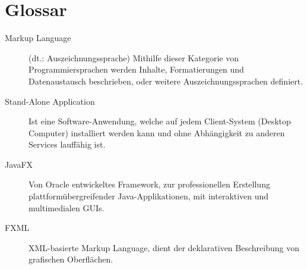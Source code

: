 \chapter{Glossar}

\begin{description}
\item[Markup Language] (dt.: Auszeichnungssprache) Mithilfe dieser Kategorie von Programmiersprachen werden Inhalte, Formatierungen und Datenaustausch beschrieben, oder weitere Auszeichnungssprachen definiert.
\item[Stand-Alone Application] Ist eine Software-Anwendung, welche auf jedem Client-System (Desktop Computer) installiert werden kann und ohne Abhängigkeit zu anderen Services lauffähig ist.
\item[JavaFX] Von Oracle entwickeltes Framework, zur professionellen Erstellung plattformübergreifender Java-Applikationen, mit interaktiven und multimedialen GUIs.
\item[FXML] XML-basierte Markup Language, dient der deklarativen Beschreibung von grafischen Oberflächen.
\end{description}